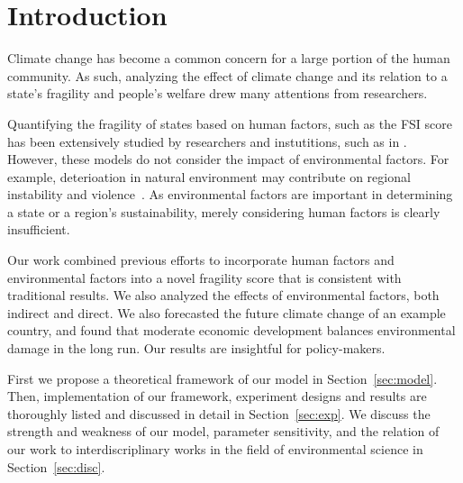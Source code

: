 \section{Introduction}	

Climate change has become a common concern for a large portion of the human community. As such, analyzing the effect of climate change and its relation to a state's fragility and people's welfare drew many attentions from researchers.

Quantifying the fragility of states based on human factors, such as the FSI score has been extensively studied by researchers and instutitions, such as in \cite{FSI_index,EPI_index}. However, these models do not consider the impact of environmental factors. For example, deterioation in natural environment may contribute on regional instability and violence~\cite{schwartz2003abrupt,theisen2013climate,krakowka2012modeling}. As environmental factors are important in determining a state or a region's sustainability, merely considering human factors is clearly insufficient. 

Our work combined previous efforts to incorporate human factors and environmental factors into a novel fragility score that is consistent with traditional results. We also analyzed the effects of environmental factors, both indirect and direct. We also forecasted the future climate change of an example country, and found that moderate economic development balances environmental damage in the long run. Our results are insightful for policy-makers.

First we propose a theoretical framework of our model in Section~\ref{sec:model}. Then, implementation of our framework, experiment designs and results are thoroughly listed and discussed in detail in Section~\ref{sec:exp}. We discuss the strength and weakness of our model, parameter sensitivity, and the relation of our work to interdiscriplinary works in the field of environmental science in Section~\ref{sec:disc}.